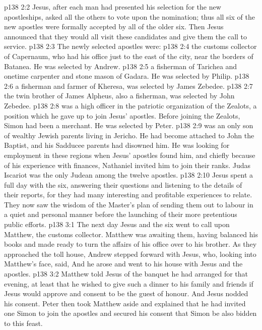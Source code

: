 \vs p138 2:2 Jesus, after each man had presented his selection for the new apostleships, asked all the others to vote upon the nomination; thus all six of the new apostles were formally accepted by all of the older six. Then Jesus announced that they would all visit these candidates and give them the call to service.
\vs p138 2:3 The newly selected apostles were:
\vs p138 2:4 \bibnobreakspace {} the customs collector of Capernaum, who had his office just to the east of the city, near the borders of Batanea. He was selected by Andrew.
\vs p138 2:5 \bibnobreakspace {} a fisherman of Tarichea and onetime carpenter and stone mason of Gadara. He was selected by Philip.
\vs p138 2:6 \bibnobreakspace {} a fisherman and farmer of Kheresa, was selected by James Zebedee.
\vs p138 2:7 \bibnobreakspace {} the twin brother of James Alpheus, also a fisherman, was selected by John Zebedee.
\vs p138 2:8 \bibnobreakspace {} was a high officer in the patriotic organization of the Zealots, a position which he gave up to join Jesus’ apostles. Before joining the Zealots, Simon had been a merchant. He was selected by Peter.
\vs p138 2:9 \bibnobreakspace {} was an only son of wealthy Jewish parents living in Jericho. He had become attached to John the Baptist, and his Sadducee parents had disowned him. He was looking for employment in these regions when Jesus’ apostles found him, and chiefly because of his experience with finances, Nathaniel invited him to join their ranks. Judas Iscariot was the only Judean among the twelve apostles.
\vs p138 2:10 \pc Jesus spent a full day with the six, answering their questions and listening to the details of their reports, for they had many interesting and profitable experiences to relate. They now saw the wisdom of the Master’s plan of sending them out to labour in a quiet and personal manner before the launching of their more pretentious public efforts.
\vs p138 3:1 The next day Jesus and the six went to call upon Matthew, the customs collector. Matthew was awaiting them, having balanced his books and made ready to turn the affairs of his office over to his brother. As they approached the toll house, Andrew stepped forward with Jesus, who, looking into Matthew’s face, said,  And he arose and went to his house with Jesus and the apostles.
\vs p138 3:2 Matthew told Jesus of the banquet he had arranged for that evening, at least that he wished to give such a dinner to his family and friends if Jesus would approve and consent to be the guest of honour. And Jesus nodded his consent. Peter then took Matthew aside and explained that he had invited one Simon to join the apostles and secured his consent that Simon be also bidden to this feast.
